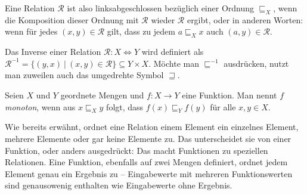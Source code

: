 Eine Relation $\mathcal{R}$ ist also linksabgeschlossen bezüglich einer Ordnung $\sqsubseteq_{X}$, wenn die Komposition dieser Ordnung mit $\mathcal{R}$
wieder $\mathcal{R}$ ergibt, oder in anderen Worten: wenn für jedes $(x, y) \in \mathcal{R}$ gilt, dass zu jedem $a \sqsubseteq_{X} x$
auch $(a, y) \in \mathcal{R}$.

\begin{mydef}
Das Inverse einer Relation $\mathcal{R} : X \Leftrightarrow Y$ wird definiert als $\mathcal{R}^{-1} = \{(y, x) ~|~ (x, y) \in \mathcal{R}\}
\subseteq Y \times X$. Möchte man $\sqsubseteq^{-1}$ ausdrücken, nutzt man zuweilen auch das umgedrehte Symbol $\sqsupseteq$.
\end{mydef}

\begin{mydef}
Seien $X$ und $Y$ geordnete Mengen und $f : X \rightarrow Y$ eine Funktion. Man nennt $f$ \textit{monoton}, wenn aus $x
\sqsubseteq_{X} y$ folgt, dass $f(x) \sqsubseteq_{Y} f(y)$ für alle $x, y \in X$.
\end{mydef}

%


Wie bereits erwähnt, ordnet eine Relation einem Element ein einzelnes Element, mehrere Elemente oder gar keine Elemente zu.
Das unterscheidet sie von einer Funktion, oder anders ausgedrückt: Das macht Funktionen zu speziellen Relationen. Eine
Funktion, ebenfalls auf zwei Mengen definiert, ordnet jedem Element genau ein Ergebnis zu -- Eingabewerte mit
mehreren Funktionswerten sind genausowenig enthalten wie Eingabewerte ohne Ergebnis.

